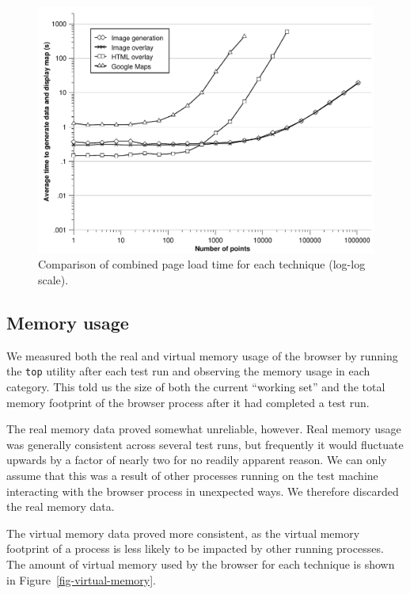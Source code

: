 \documentclass[acmtocl,acmnow]{acmtrans2m}
\begin{document}
\begin{figure}
	\begin{center}
		\includegraphics[scale=0.66]{combined_time}
	\end{center}
	\caption{Comparison of combined page load time for each technique (log-log scale).}
	\label{fig-combined-time}
\end{figure}


\subsection{Memory usage}

We measured both the real and virtual memory usage of the browser by
running the \texttt{top} utility after each test run and observing the
memory usage in each category. This told us the size of both the current
``working set'' and the total memory footprint of the browser process
after it had completed a test run.

The real memory data proved somewhat unreliable, however. Real memory
usage was generally consistent across several test runs, but frequently
it would fluctuate upwards by a factor of nearly two for no readily
apparent reason. We can only assume that this was a result of other
processes running on the test machine interacting with the browser
process in unexpected ways. We therefore discarded the real memory data.

The virtual memory data proved more consistent, as the virtual memory
footprint of a process is less likely to be impacted by other running
processes. The amount of virtual memory used by the browser for each
technique is shown in Figure~\ref{fig-virtual-memory}.
\end{document}
